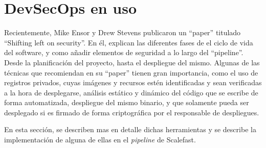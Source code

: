 \documentclass[12pt]{report} %
\begin{document}
\section{DevSecOps en uso}

Recientemente, Mike Ensor y Drew Stevens publicaron un ``paper'' titulado
``Shifting left on security''.  En él, explican las diferentes fases de el ciclo
de vida del software, y como añadir elementos de seguridad a lo largo del
``pipeline''.  Desde la planificación del proyecto, hasta el despliegue del
mismo.  Algunas de las técnicas que recomiendan en su ``paper'' tienen gran
importancia, como el uso de registros privados, cuyas imágenes y recursos estén
identificadas y sean verificadas a la hora de desplegarse, análisis estático y
dinámico del código que se escribe de forma automatizada, despliegue del mismo
binario, y que solamente pueda ser desplegado si es firmado de forma
criptográfica por el responsable de despliegues.\cite{Ensor2021}

En esta sección, se describen mas en detalle dichas herramientas y se describe
la implementación de alguna de ellas en el \textit{\gls{pipeline}} de Scalefast.

\clearpage

\printglossary[type=\acronymtype]

\printglossary




\end{document}
